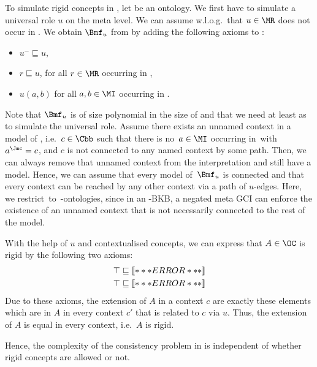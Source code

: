To simulate rigid concepts in \LMLOplus, let \BB be an \LMLOplus ontology. We first have to
simulate a universal role $u$ on the meta level. We can assume w.l.o.g.\
that $u\in\MR$ does not occur in \Bmf. We obtain $\Bmf_{u}$ from \Bmf by adding the following axioms
to \Bmf:
\begin{itemize}
\item $u^{-} \sqsubseteq u$,
\item $r \sqsubseteq u$, for all $r\in\MR$ occurring in \Bmf,
\item $u(a,b)$ for all $a,b\in\MI$ occurring in \Bmf. 
\end{itemize}
Note that $\Bmf_{u}$ is of size polynomial in the size of \Bmf and that we need at least \ALCHI as
\LM to simulate the universal role.
%
Assume there exists an unnamed context in a model of \Bmf, i.e.~$c\in\Cbb$ such that there is
no~$a\in\MI$ occurring in~\Bmf with~$a^{\J}=c$, and $c$ is not connected to any named context by some
path. Then, we can always remove that unnamed context from the interpretation and still have a model.
Hence, we can assume that every model of~$\Bmf_{u}$ is connected and that every context can be
reached by any other context via a path of $u$-edges.
%
Here, we restrict~\Bmf to~\LMLOplus-ontologies, since in an \LMLOplus-BKB, a negated meta GCI can
enforce the existence of an unnamed context that is not necessarily connected to the rest of the model.


With the help of $u$ and contextualised concepts, we can express that $A\in\OC$ is rigid by the
following two axioms:
\begin{align*}
  \top & \sqsubseteq \oax{A \sqsubseteq \ocont*{\top}[u]{A}} \\
  \top & \sqsubseteq \oax{\lnot A \sqsubseteq \ocont*{\top}[u]{\lnot A}}
\end{align*}
Due to these axioms, the extension of $A$ in a context $c$ are exactly these elements which are in
$A$ in every context $c'$ that is related to $c$ via $u$. Thus, the extension of $A$ is equal in
every context, i.e.\ $A$ is rigid.

Hence, the complexity of the consistency problem in \LMLOplus is independent of whether rigid
concepts are allowed or not.




